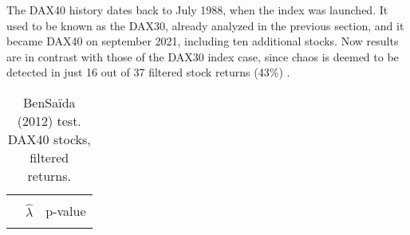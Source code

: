 \documentclass[12pt]{article}
\begin{document}
The DAX40 history dates back to July 1988, when the index was launched. It used to be known as the DAX30, already analyzed in the previous section, and 
it became DAX40 on september 2021, including ten additional stocks. Now results are in contrast with those of the DAX30 index case, since chaos is deemed to be detected in just 16 out of 37 filtered stock returns (43\%) .  


\begin{table} [H]\small
    \caption{ BenSa\"{i}da (2012) test. DAX40 stocks, filtered returns.}
        \footnotesize
    \begin{tabular*}{\textwidth}{@{\extracolsep{\fill}}lrl}
        \hline &  &  \\ 
        
                  & $\hat{\lambda}$ &  p-value \\
        \hline &  &  \\ 


\end{tabular*}
\end{table}
\end{document}
